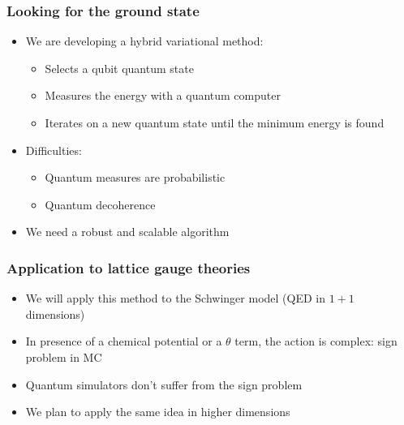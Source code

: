 \documentclass[10pt,t,xcolor=dvipsnames,aspectratio=169]{beamer}
\begin{document}
\begin{frame}
    \frametitle{Looking for the ground state}
    \begin{itemize}
        \item
            We are developing a hybrid variational method:
            \begin{itemize}
                \item Selects a qubit quantum state
                \item Measures the energy with a quantum computer
                \item Iterates on a new quantum state until the minimum energy is found
            \end{itemize}
        \item
            Difficulties:
            \begin{itemize}
                \item Quantum measures are probabilistic
                \item Quantum decoherence
            \end{itemize}
        \item
            We need a robust and scalable algorithm
    \end{itemize}
\end{frame}

\begin{frame}
    \frametitle{Application to lattice gauge theories}
    \begin{itemize}
        \item
            We will apply this method to the Schwinger model (QED in $1+1$ dimensions)
        \item
            In presence of a chemical potential or a $\theta$ term, the action is complex: sign problem in MC
        \item
            Quantum simulators don't suffer from the sign problem
        \item
            We plan to apply the same idea in higher dimensions
    \end{itemize}
\end{frame}
\end{document}
